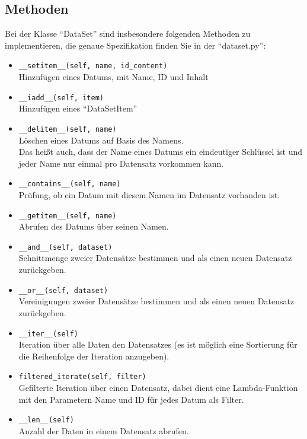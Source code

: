 \documentclass[a4paper,11pt]{article}
\begin{document}
\subsection{Methoden}

Bei der Klasse ``DataSet'' sind insbesondere folgenden Methoden zu implementieren, die genaue Spezifikation finden Sie in der ``dataset.py'':

\begin{itemize}
    \item \texttt{\_\_setitem\_\_(self, name, id\_content)}\\
    Hinzufügen eines Datums, mit Name, ID und Inhalt
    \item \texttt{\_\_iadd\_\_(self, item)}\\
    Hinzufügen eines ``DataSetItem''
    \item \texttt{\_\_delitem\_\_(self, name)}\\
    Löschen eines Datums auf Basis des Namens.\\
    Das heißt auch, dass der Name eines Datums ein eindeutiger Schlüssel ist und jeder Name nur einmal pro Datensatz vorkommen kann.
    \item \texttt{\_\_contains\_\_(self, name)}\\
    Prüfung, ob ein Datum mit diesem Namen im Datensatz vorhanden ist.
    \item \texttt{\_\_getitem\_\_(self, name)}\\
    Abrufen des Datums über seinen Namen.
    \item \texttt{\_\_and\_\_(self, dataset)}\\
    Schnittmenge zweier Datensätze bestimmen und als einen neuen Datensatz zurückgeben.
    \item \texttt{\_\_or\_\_(self, dataset)}\\
    Vereinigungen zweier Datensätze bestimmen und als einen neuen Datensatz zurückgeben.
    \item \texttt{\_\_iter\_\_(self)}\\
    Iteration über alle Daten den Datensatzes (es ist möglich eine Sortierung für die Reihenfolge der Iteration anzugeben).
    \item \texttt{filtered\_iterate(self, filter)}\\
    Gefilterte Iteration über einen Datensatz, dabei dient eine Lambda-Funktion mit den Parametern Name und ID für jedes Datum als Filter.
    \item \texttt{\_\_len\_\_(self)}\\
    Anzahl der Daten in einem Datensatz abrufen.
\end{itemize}
\end{document}
